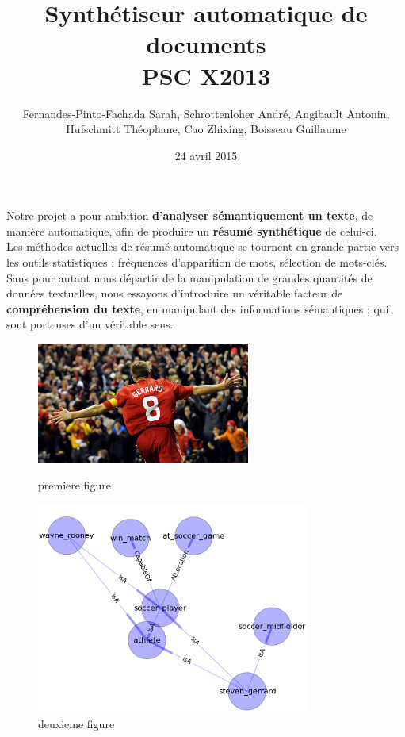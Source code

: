 \documentclass[a4paper,12pt]{article}
\title{Synthétiseur automatique de documents\\ PSC X2013}
\author{Fernandes-Pinto-Fachada Sarah, Schrottenloher Andr\'e, Angibault Antonin,\\
Hufschmitt Th\'eophane, Cao Zhixing, Boisseau Guillaume}
\date{24 avril 2015}
\begin{document}
\titrecourt %


Notre projet a pour ambition \textbf{d'analyser sémantiquement un texte}, de manière automatique, afin de produire un \textbf{résumé synthétique} de celui-ci. \\


Les méthodes actuelles de résumé automatique se tournent en grande partie vers les outils statistiques : fréquences d'apparition de mots, sélection de mots-clés. Sans pour autant nous départir de la manipulation de grandes quantités de données textuelles, nous essayons d'introduire un véritable facteur de \textbf{compréhension du texte}, en manipulant des informations sémantiques ; qui sont porteuses d'un véritable sens. 

\begin{figure}
 \begin{minipage}[b]{.46\linewidth}
  \centering
  \includegraphics[width=7cm]{./gerrard.jpg}
  \caption{premiere figure \label{fig1}}
 \end{minipage} \hfill
 \begin{minipage}[b]{.46\linewidth}
  \centering
  \includegraphics[width=9cm]{./figure_1.png}
  \caption{deuxieme figure \label{fig2}}
 \end{minipage}
\end{figure}
\end{document}

